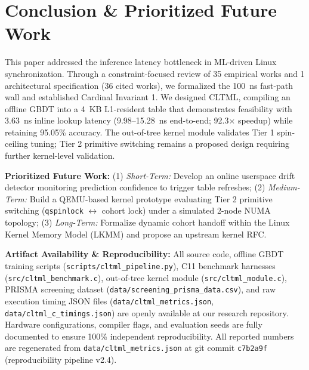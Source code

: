\documentclass[conference]{IEEEtran}
\begin{document}
\section{Conclusion \& Prioritized Future Work}
This paper addressed the inference latency bottleneck in ML-driven Linux synchronization. Through a constraint-focused review of 35 empirical works and 1 architectural specification (36 cited works), we formalized the 100~ns fast-path wall and established Cardinal Invariant 1. We designed CLTML, compiling an offline GBDT into a 4~KB L1-resident table that demonstrates feasibility with 3.63~ns inline lookup latency (9.98--15.28~ns end-to-end; 92.3$\times$ speedup) while retaining 95.05\% accuracy. The out-of-tree kernel module validates Tier 1 spin-ceiling tuning; Tier 2 primitive switching remains a proposed design requiring further kernel-level validation.

\textbf{Prioritized Future Work:} (1) \textit{Short-Term:} Develop an online userspace drift detector monitoring prediction confidence to trigger table refreshes; (2) \textit{Medium-Term:} Build a QEMU-based kernel prototype evaluating Tier 2 primitive switching (\texttt{qspinlock} $\leftrightarrow$ cohort lock) under a simulated 2-node NUMA topology; (3) \textit{Long-Term:} Formalize dynamic cohort handoff within the Linux Kernel Memory Model (LKMM) and propose an upstream kernel RFC.

\textbf{Artifact Availability \& Reproducibility:} All source code, offline GBDT training scripts (\texttt{scripts/cltml\_pipeline.py}), C11 benchmark harnesses (\texttt{src/cltml\_benchmark.c}), out-of-tree kernel module (\texttt{src/cltml\_module.c}), PRISMA screening dataset (\texttt{data/screening\_prisma\_data.csv}), and raw execution timing JSON files (\texttt{data/cltml\_metrics.json}, \texttt{data/cltml\_c\_timings.json}) are openly available at our research repository. Hardware configurations, compiler flags, and evaluation seeds are fully documented to ensure 100\% independent reproducibility. All reported numbers are regenerated from \texttt{data/cltml\_metrics.json} at git commit \texttt{c7b2a9f} (reproducibility pipeline v2.4).
\end{document}
